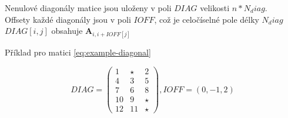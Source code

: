 \documentclass[../main.tex]{subfiles}
\begin{document}
Nenulové diagonály matice \matA jsou uloženy v poli $DIAG$ velikosti $n*N_diag$.\\
Offsety každé diagonály jsou v poli $IOFF$, což je celočíselné pole délky $N_diag$\\
$DIAG[i,j]$ obsahuje $\mathbf{A}_{i,i+IOFF[j]}$

\begin{example}
    Příklad pro matici \eqref{eq:example-diagonal}


\begin{equation*}
    DIAG = \begin{pmatrix}
        1 & \star & 2 \\
        4 & 3 & 5 \\
        7 & 6 & 8 \\
        10 & 9 & \star \\
        12 & 11 & \star 
        \end{pmatrix}, IOFF = (0, -1, 2)
\end{equation*}

\end{example}
\end{document}
